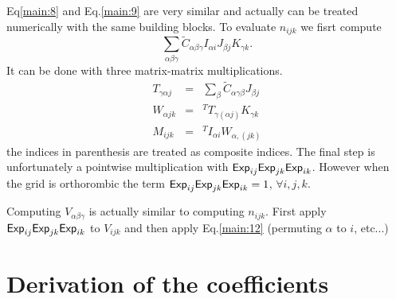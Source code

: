 \documentclass[prb]{revtex4}
\begin{document}
Eq\ref{main:8} and Eq.\ref{main:9} are very similar and actually can be treated
numerically with the same building blocks. To evaluate $n_{ijk}$ we fisrt
compute
\begin{equation*}
  \sum_{\alpha\beta\gamma}  {\tilde C}_{\alpha\beta\gamma} I_{\alpha i} J_{\beta j} K_{\gamma k}.
\end{equation*}
It can be done with three matrix-matrix multiplications.
\begin{eqnarray}
  \label{main12}
  T_{\gamma\alpha j} &=& \sum_{\beta} {\tilde C}_{\alpha\gamma\beta} J_{\beta j}\\
  W_{\alpha j k} &=& ^T T_{\gamma(\alpha j)} K_{\gamma k}\\
  M_{ijk} &=& ^T I_{\alpha i} W_{\alpha, (jk)}
\end{eqnarray}
the indices in parenthesis are treated as composite indices. The final step is
unfortunately a pointwise multiplication with ${\sf Exp}_{ij} {\sf Exp}_{jk}
{\sf Exp}_{ik}$. However when the grid is orthorombic the term ${\sf Exp}_{ij}
{\sf Exp}_{jk} {\sf Exp}_{ik} = 1$, $\forall i,j,k$.

Computing $V_{\alpha\beta\gamma}$ is actually similar to computing $n_{ijk}$.
First apply ${\sf Exp}_{ij} {\sf Exp}_{jk} {\sf Exp}_{ik}$ to $V_{ijk}$ and then
apply Eq.\ref{main:12} (permuting $\alpha$ to $i$, etc...)


\section{Derivation of the coefficients}\label{coeff}
\end{document}
